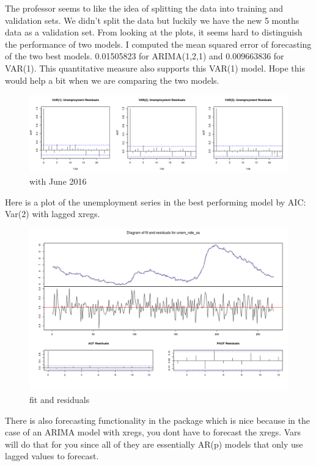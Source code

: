 \documentclass[twoside,twocolumn]{article}
\begin{document}
The professor seems to like the idea of splitting the data into training and validation sets. We didn't split the data but luckily we have the new 5 months data as a validation set. From looking at the plots, it seems hard to distinguish the performance of two models. I computed the mean squared error of forecasting of the two best models. 0.01505823 for ARIMA(1,2,1) and 0.009663836 for VAR(1). This quantitative measure also supports this VAR(1) model. Hope this would help a bit when we are comparing the two models.  
  \begin{figure}[htb]
    	\centering
     	\caption{with June 2016}
     	\includegraphics[width=\linewidth]{images/varUnemresid}
 \end{figure}
 
 Here is a plot of the unemployment series in the best performing model by AIC: Var(2) with lagged xregs.
 
   \begin{figure}[htb]
    	\centering
     	\caption{fit and residuals}
     	\includegraphics[width=\linewidth]{images/unem_rate_fit_resid}
 \end{figure}
 
 There is also forecasting functionality in the package which is nice because in the case of an ARIMA model with xregs, you dont have to forecast the xregs. Vars will do that for you since all of they are essentially AR(p) models that only use lagged values to forecast.
 
\end{document}
